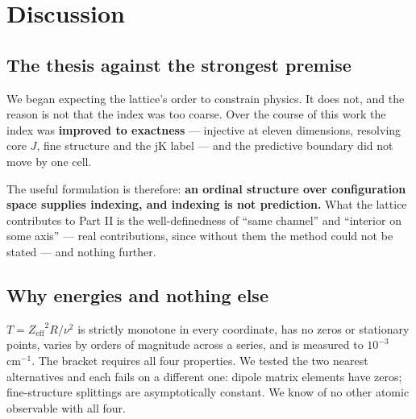 \documentclass[11pt,a4paper]{article}
\theoremstyle{definition}
\newcommand{\Zeff}{\ensuremath{Z_{\mathrm{eff}}}}
\newcommand{\cmi}{\,\ensuremath{\mathrm{cm}^{-1}}}
\begin{document}
\section{Discussion}

\subsection{The thesis against the strongest premise}
We began expecting the lattice's order to constrain physics. It does not, and
the reason is not that the index was too coarse. Over the course of this work
the index was \textbf{improved to exactness} --- injective at eleven dimensions,
resolving core $J$, fine structure and the jK label --- and the predictive
boundary did not move by one cell.

The useful formulation is therefore: \textbf{an ordinal structure over
configuration space supplies indexing, and indexing is not prediction.} What the
lattice contributes to Part II is the well-definedness of ``same channel'' and
``interior on some axis'' --- real contributions, since without them the method
could not be stated --- and nothing further.

\subsection{Why energies and nothing else}
$T=\Zeff^{2}R/\nu^{2}$ is strictly monotone in every coordinate, has no zeros or
stationary points, varies by orders of magnitude across a series, and is
measured to $10^{-3}$\cmi. The bracket requires all four properties. We tested
the two nearest alternatives and each fails on a different one: dipole matrix
elements have zeros; fine-structure splittings are asymptotically constant. We
know of no other atomic observable with all four.
\end{document}
